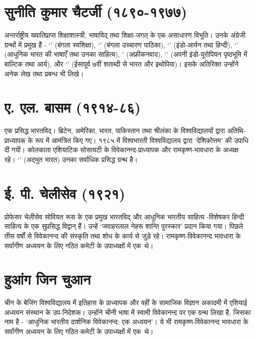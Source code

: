 \section*{सुनीति कुमार चैटर्जी (१८९०-१९७७) }

अन्तर्राष्ट्रीय ख्यातिप्राप्त शिक्षाशास्त्री, भाषाविद् तथा शिक्षा-जगत् के एक असाधारण विभूति। उनके अंग्रेजी ग्रन्थों में प्रमुख हैं - ‘’ (बंगला स्वशिक्षा), ‘’ (बंगला उच्चारण पाठिका), ‘’ (इंडो-आर्यन तथा हिन्दी), ‘’ (आधुनिक भारत की भाषाएँ तथा उनका साहित्य), ’ (अफ्रीकनवाद), ‘’ (अपनी इंडो-यूरोपियन पृष्ठभूमि में बाल्टिक तथा आर्य), और ‘’ (ईसापूर्व ७वीं शताब्दी से भारत और इथोपिया)। इसके अतिरिक्त उन्होंने अनेक लेख तथा प्रबन्ध भी लिखे। 

\section*{ए. एल. बासम (१९१४-८६) }

एक प्रसिद्ध भारतविद्। ब्रिटेन, अमेरिका, भारत, पाकिस्तान तथा श्रीलंका के विश्वविद्यालयों द्वारा अतिथि-प्राध्यापक के रूप में आमंत्रित किए गए। १९८५ में विश्वभारती विश्वविद्यालय द्वारा ‘देशि\-कोत्तम’ की उपाधि दी गयी। कोलकाता एशियाटिक सोसायटी के विवेकानन्द-प्राध्यापक और रामकृष्ण-भावधारा के अध्यक्ष रहे। ‘’ (अद्भुत भारत) उनका सर्वाधिक प्रसिद्ध ग्रन्थ है। 

\section*{ई. पी. चेलीसेव (१९२१) }

प्रोफेसर चेलीसेव सोवियत रूस के एक प्रमुख भारतविद् और आधुनिक भारतीय साहित्य -\break विशेषकर हिन्दी साहित्य के एक सुप्रसिद्ध विद्वान् हैं। उन्हें ‘जवाहरलाल नेहरू शान्ति पुरस्कार’ प्रदान किया गया। पिछले तीस वर्षों से विवेकानन्द की संस्कृति तथा शोध के कार्य से जुड़े रहे। रामकृष्ण-विवेकानन्द भावधारा के सर्वांगीण अध्ययन के लिए गठित कमेटी के उपाध्यक्षों में एक~थे। 

\section*{हुआंग जिन चुआन }

चीन के बेजिंग विश्वविद्यालय में इतिहास के प्राध्यापक और वहीं के सामाजिक विज्ञान अकादमी में एशियाई अध्ययन संस्थान के उप-निदेशक। उन्होंने चीनी भाषा में स्वामी विवेकानन्द पर एक ग्रन्थ लिखा है, जिसका नाम है - ‘आधुनिक भारतीय दार्शनिक विवेकानन्द: एक अध्ययन’। ये भी रामकृष्ण-विवेकानन्द भावधारा के सर्वांगीण अध्ययन के लिए गठित कमेटी के उपाध्यक्षों में एक~थे। 

\delimiter


